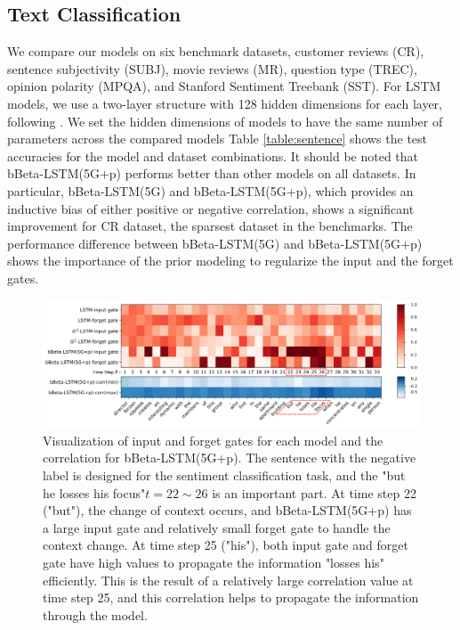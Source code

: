 \documentclass[letterpaper]{article} %
\begin{document}
\subsection{Text Classification}
We compare our models on six benchmark datasets, customer reviews (CR), sentence subjectivity (SUBJ), movie reviews (MR), question type (TREC), opinion polarity (MPQA), and Stanford Sentiment Treebank (SST). For LSTM models, we use a two-layer structure with 128 hidden dimensions for each layer, following \cite{sru}. We set the hidden dimensions of models to have the same number of parameters across the compared models
%
Table \ref{table:sentence} shows the test accuracies for the model and dataset combinations.
It should be noted that bBeta-LSTM(5G+p) performs better than other models on all datasets. In particular, bBeta-LSTM(5G) and bBeta-LSTM(5G+p), which provides an inductive bias of either positive or negative correlation, shows a significant improvement for CR dataset, the sparsest dataset in the benchmarks.
The performance difference between bBeta-LSTM(5G) and bBeta-LSTM(5G+p) shows the importance of the prior modeling to regularize the input and the forget gates.
%
\begin{figure}[t!] %
	\centering
	\includegraphics[width=\linewidth]{mr_1467_case.png}
	\caption{Visualization of input and forget gates for each model and the correlation for bBeta-LSTM(5G+p). The sentence with the negative label is designed for the sentiment classification task, and the "but he losses his focus"$t=22 \sim 26$ is an important part. At time step 22 ("but"), the change of context occurs, and bBeta-LSTM(5G+p) has a large input gate and relatively small forget gate to handle the context change. At time step 25 ("his"), both input gate and forget gate have high values to propagate the information "losses his" efficiently. This is the result of a relatively large correlation value at time step 25, and this correlation helps to propagate the information through the model.
	}
	\label{fig:case_study}
\end{figure}
\end{document}
